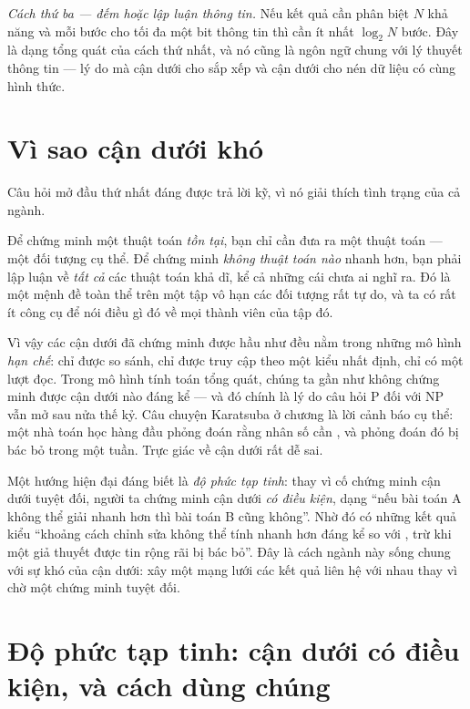 \documentclass[../../algorithm.tex]{subfiles}
\begin{document}
\emph{Cách thứ ba --- đếm hoặc lập luận thông tin.} Nếu kết quả cần phân biệt \(N\) khả năng và mỗi bước cho tối đa một bit thông tin thì cần ít nhất \(\log_2 N\) bước. Đây là dạng tổng quát của cách thứ nhất, và nó cũng là ngôn ngữ chung với lý thuyết thông tin --- lý do mà cận dưới cho sắp xếp và cận dưới cho nén dữ liệu có cùng hình thức.

\section{Vì sao cận dưới khó}

Câu hỏi mở đầu thứ nhất đáng được trả lời kỹ, vì nó giải thích tình trạng của cả ngành.

Để chứng minh một thuật toán \emph{tồn tại}, bạn chỉ cần đưa ra một thuật toán --- một đối tượng cụ thể. Để chứng minh \emph{không thuật toán nào} nhanh hơn, bạn phải lập luận về \emph{tất cả} các thuật toán khả dĩ, kể cả những cái chưa ai nghĩ ra. Đó là một mệnh đề toàn thể trên một tập vô hạn các đối tượng rất tự do, và ta có rất ít công cụ để nói điều gì đó về mọi thành viên của tập đó.

Vì vậy các cận dưới đã chứng minh được hầu như đều nằm trong những mô hình \emph{hạn chế}: chỉ được so sánh, chỉ được truy cập theo một kiểu nhất định, chỉ có một lượt đọc. Trong mô hình tính toán tổng quát, chúng ta gần như không chứng minh được cận dưới nào đáng kể --- và đó chính là lý do câu hỏi P đối với NP vẫn mở sau nửa thế kỷ. Câu chuyện Karatsuba ở chương  là lời cảnh báo cụ thể: một nhà toán học hàng đầu phỏng đoán rằng nhân số cần , và phỏng đoán đó bị bác bỏ trong một tuần. Trực giác về cận dưới rất dễ sai.

Một hướng hiện đại đáng biết là \emph{độ phức tạp tinh}: thay vì cố chứng minh cận dưới tuyệt đối, người ta chứng minh cận dưới \emph{có điều kiện}, dạng ``nếu bài toán A không thể giải nhanh hơn thì bài toán B cũng không''. Nhờ đó có những kết quả kiểu ``khoảng cách chỉnh sửa không thể tính nhanh hơn đáng kể so với , trừ khi một giả thuyết được tin rộng rãi bị bác bỏ''. Đây là cách ngành này sống chung với sự khó của cận dưới: xây một mạng lưới các kết quả liên hệ với nhau thay vì chờ một chứng minh tuyệt đối.

\section{Độ phức tạp tinh: cận dưới có điều kiện, và cách dùng chúng}
\end{document}
